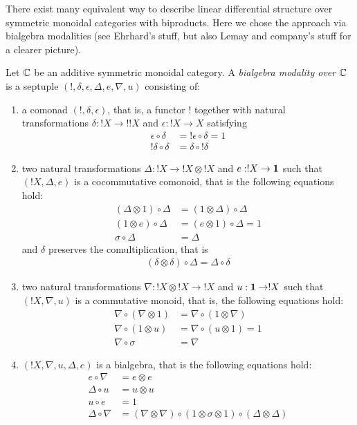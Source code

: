 There exist many equivalent way to describe linear differential structure over symmetric monoidal categories with biproducts. Here we chose the approach via bialgebra modalities (see Ehrhard's stuff, but also Lemay and company's stuff for a clearer picture).


\begin{definition}
Let $\mathbb{C}$ be an additive symmetric monoidal category. A \emph{bialgebra modality over $\mathbb{C}$} is a septuple $(!,\delta,\epsilon, \Delta, e,\nabla, u)$ consisting of:
\begin{enumerate}
\item a comonad $(!,\delta,\epsilon)$, that is, a functor $!$ together with natural transformations $\delta: !X\to !!X$ and $\epsilon:!X\to X$ satisfying
\begin{align}
\epsilon \circ \delta & = !\epsilon \circ \delta= 1 \\
!\delta \circ \delta  & = \delta\circ !\delta
\end{align}

\item two natural transformations $\Delta:!X\to !X\otimes !X$ and $e:!X\to \mathbf{1}$ such that $(!X, \Delta, e)$ is a cocommutative comonoid, that is the following equations hold:
\begin{align}
(\Delta \otimes  1)\circ \Delta & = ( 1\otimes \Delta )\circ \Delta \\
 ( 1\otimes e)\circ \Delta & = (e\otimes  1)\circ \Delta =1 \\
\sigma \circ\Delta& =  \Delta
\end{align}
and $\delta$ preserves the comultiplication, that is
\begin{align}
(\delta \otimes \delta)\circ \Delta = \Delta \circ \delta
\end{align}

\item two natural transformations $\nabla: !X\otimes !X \to !X$ and $u:\mathbf{1}\to !X$ such that $(!X,\nabla, u)$ is a commutative monoid, that is, the following equations hold:
\begin{align}
\nabla\circ (\nabla\otimes 1)  & = \nabla \circ (1\otimes \nabla) \\
 \nabla \circ(1\otimes u )& = \nabla \circ  (u\otimes 1) =1\\
\nabla\circ \sigma & = \nabla
\end{align}

\item $(!X,\nabla, u, \Delta, e)$ is a bialgebra, that is the following equations hold:
\begin{align}
e\circ\nabla  & =  e\otimes e\\
 \Delta \circ u& = u\otimes u \\
u\circ e & = 1\\
 \Delta \circ \nabla 
&=(\nabla\otimes \nabla)\circ (1\otimes \sigma\otimes 1)\circ (\Delta\otimes \Delta)
\end{align}


\end{enumerate}
\end{definition}
